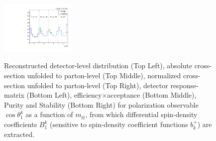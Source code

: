 \begin{figure}[htb]
\begin{center}
 \includegraphics[width=0.32\textwidth]{fig_fullRun2UL/unfolding/combined/PurStab_b1k_mttbar.pdf} \\
\caption{Reconstructed detector-level distribution (Top Left), absolute cross-section unfolded to parton-level (Top Middle), normalized cross-section unfolded to parton-level (Top Right), detector response-matrix (Bottom Left), efficiency$\times$acceptance (Bottom Middle), Purity and Stability (Bottom Right) for polarization observable $\cos\theta_{1}^{k}$ as a function of $m_{t\bar{t}}$, from which differential spin-density coefficients $B_{1}^{k}$ (sensitive to spin-density coefficient functions $b_k^{+}$) are extracted.}
\label{fig:b1k_mttbar}
\end{center}
\end{figure}
\clearpage
